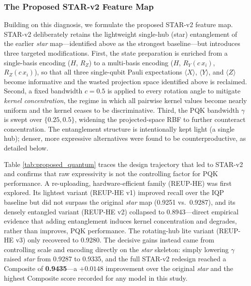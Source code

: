 \documentclass{ieeeaccess}
\begin{document}
\subsubsection{The Proposed STAR-v2 Feature Map}

Building on this diagnosis, we formulate the proposed STAR-v2 feature map. STAR-v2 deliberately retains the lightweight single-hub (star) entanglement of the earlier \textit{star} map---identified above as the strongest baseline---but introduces three targeted modifications. First, the state preparation is enriched from a single-basis encoding ($H$, $R_Z$) to a multi-basis encoding ($H$, $R_Y(c\,x_i)$, $R_Z(c\,x_i)$), so that all three single-qubit Pauli expectations $\langle X\rangle$, $\langle Y\rangle$, and $\langle Z\rangle$ become informative and the wasted projection space identified above is reclaimed. Second, a fixed bandwidth $c=0.5$ is applied to every rotation angle to mitigate \textit{kernel concentration}, the regime in which all pairwise kernel values become nearly uniform and the kernel ceases to be discriminative. Third, the PQK bandwidth $\gamma$ is swept over $\{0.25,0.5\}$, widening the projected-space RBF to further counteract concentration. The entanglement structure is intentionally kept light (a single hub); denser, more expressive alternatives were found to be counterproductive, as detailed below.

Table \ref{tab:proposed_quantum} traces the design trajectory that led to STAR-v2 and confirms that raw expressivity is not the controlling factor for PQK performance. A re-uploading, hardware-efficient family (REUP-HE) was first explored. Its lightest variant (REUP-HE v1) improved recall over the IQP baseline but did not surpass the original \textit{star} map (0.9251 vs.\ 0.9287), and its densely entangled variant (REUP-HE v2) collapsed to 0.8943---direct empirical evidence that adding entanglement induces kernel concentration and degrades, rather than improves, PQK performance. The rotating-hub lite variant (REUP-HE v3) only recovered to 0.9280. The decisive gains instead came from controlling scale and encoding directly on the \textit{star} skeleton: simply lowering $\gamma$ raised \textit{star} from 0.9287 to 0.9335, and the full STAR-v2 redesign reached a Composite of \textbf{0.9435}---a $+0.0148$ improvement over the original \textit{star} and the highest Composite score recorded for any model in this study.
\end{document}
